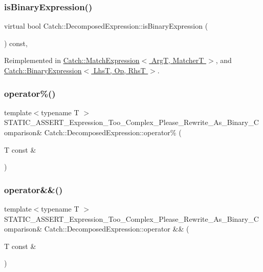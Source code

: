\subsubsection{\texorpdfstring{is\+Binary\+Expression()}{isBinaryExpression()}}
{\footnotesize\ttfamily virtual bool Catch\+::\+Decomposed\+Expression\+::is\+Binary\+Expression (\begin{DoxyParamCaption}{ }\end{DoxyParamCaption}) const\hspace{0.3cm}{\ttfamily [inline]}, {\ttfamily [virtual]}}



Reimplemented in \hyperlink{class_catch_1_1_match_expression_ac4edf6e9a6e5762a487db1486d0d1f45}{Catch\+::\+Match\+Expression$<$ Arg\+T, Matcher\+T $>$}, and \hyperlink{class_catch_1_1_binary_expression_a4c617c0b6a73a9cafbbf900909c7c258}{Catch\+::\+Binary\+Expression$<$ Lhs\+T, Op, Rhs\+T $>$}.

\mbox{\label{struct_catch_1_1_decomposed_expression_a6584335aadaee847c9d06ca8f13a4477}} 
\subsubsection{\texorpdfstring{operator\%()}{operator\%()}}
{\footnotesize\ttfamily template$<$typename T $>$ \\
S\+T\+A\+T\+I\+C\+\_\+\+A\+S\+S\+E\+R\+T\+\_\+\+Expression\+\_\+\+Too\+\_\+\+Complex\+\_\+\+Please\+\_\+\+Rewrite\+\_\+\+As\+\_\+\+Binary\+\_\+\+Comparison\& Catch\+::\+Decomposed\+Expression\+::operator\% (\begin{DoxyParamCaption}\item[{T const \&}]{ }\end{DoxyParamCaption})}

\mbox{\label{struct_catch_1_1_decomposed_expression_a14d913535796145b39101a16c0c490da}} 
\subsubsection{\texorpdfstring{operator\&\&()}{operator\&\&()}}
{\footnotesize\ttfamily template$<$typename T $>$ \\
S\+T\+A\+T\+I\+C\+\_\+\+A\+S\+S\+E\+R\+T\+\_\+\+Expression\+\_\+\+Too\+\_\+\+Complex\+\_\+\+Please\+\_\+\+Rewrite\+\_\+\+As\+\_\+\+Binary\+\_\+\+Comparison\& Catch\+::\+Decomposed\+Expression\+::operator \&\& (\begin{DoxyParamCaption}\item[{T const \&}]{ }\end{DoxyParamCaption})}

